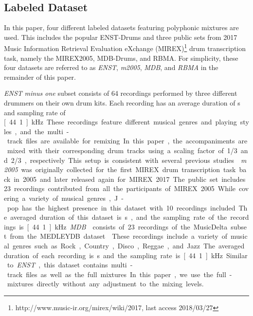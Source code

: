\documentclass{article}
\begin{document}
\subsection{Labeled Dataset}
In this paper, four different labeled datasets featuring polyphonic mixtures are used. This includes the popular ENST-Drums and three public sets from 2017 Music Information Retrieval Evaluation eXchange (MIREX)\footnote{http://www.music-ir.org/mirex/wiki/2017, last access 2018/03/27} drum transcription task, namely the MIREX2005, MDB-Drums, and RBMA. For simplicity, these four datasets are referred to as \textit{ENST}, \textit{m2005}, \textit{MDB}, and \textit{RBMA} in the remainder of this paper. 

\textit{ENST} \textit{minus one} subset \cite{Gillet2006_enst} consists of 64 recordings performed by three different drummers on their own drum kits. Each recording has an average duration of \unit[55]{s} and sampling rate of \unit[44.1]{kHz}. These recordings feature different musical genres and playing styles, and the multi-track files are available for remixing. In this paper, the accompaniments are mixed with their corresponding drum tracks using a scaling factor of 1/3 and 2/3, respectively. This setup is consistent with several previous studies \cite{Wu2015_ismir, Vogl2016, Southall2016}. 

\textit{m2005} was originally collected for the first MIREX drum transcription task back in 2005 and later released again for MIREX 2017. The public set includes 23 recordings contributed from all the participants of MIREX 2005. While covering a variety of musical genres, J-pop has the highest presence in this dataset with 10 recordings included. The averaged duration of this dataset is \unit[125]{s}, and the sampling rate of the recordings is \unit[44.1]{kHz}. 

\textit{MDB} \cite{Southall2017_mdb} consists of 23 recordings of the MusicDelta subset from the MEDLEYDB dataset \cite{Bittner2014a}. These recordings include a variety of musical genres such as Rock, Country, Disco, Reggae, and Jazz. The averaged duration of each recording is \unit[54]{s} and the sampling rate is \unit[44.1]{kHz}. Similar to \textit{ENST}, this dataset contains multi-track files as well as the full mixtures. In this paper, we use the full-mixtures directly without any adjustment to the mixing levels. 
\end{document}

